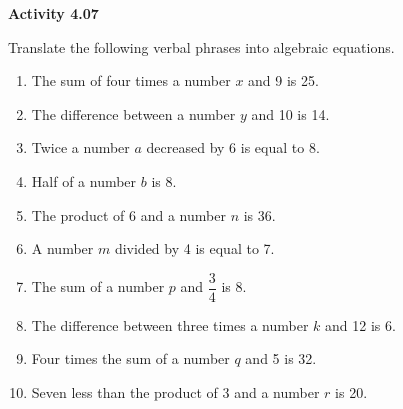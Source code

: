 \vspace{0.3ex}
\noindent\textbf{Activity 4.07}

\vspace{0.2ex}

Translate the following verbal phrases into algebraic equations. 

\begin{enumerate}
    \item The sum of four times a number \(x\) and 9 is 25.  
    \item The difference between a number \(y\) and 10 is 14.  
    \item Twice a number \(a\) decreased by 6 is equal to 8.  
    \item Half of a number \(b\) is 8.  
    \item The product of 6 and a number \(n\) is 36.  
    \item A number \(m\) divided by 4 is equal to 7.  
    \item The sum of a number \(p\) and \(\dfrac{3}{4}\) is 8.  
    \item The difference between three times a number \(k\) and 12 is 6.  
    \item Four times the sum of a number \(q\) and 5 is 32.  
    \item Seven less than the product of 3 and a number \(r\) is 20.  
\end{enumerate}
